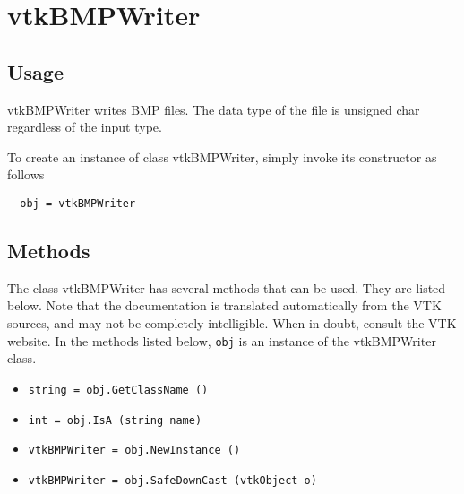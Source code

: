 \section{vtkBMPWriter}

\subsection{Usage}

 vtkBMPWriter writes BMP files. The data type
 of the file is unsigned char regardless of the input type.

To create an instance of class vtkBMPWriter, simply
invoke its constructor as follows
\begin{verbatim}
  obj = vtkBMPWriter
\end{verbatim}
\subsection{Methods}

The class vtkBMPWriter has several methods that can be used.
  They are listed below.
Note that the documentation is translated automatically from the VTK sources,
and may not be completely intelligible.  When in doubt, consult the VTK website.
In the methods listed below, \verb|obj| is an instance of the vtkBMPWriter class.
\begin{itemize}
\item  \verb|string = obj.GetClassName ()|

\item  \verb|int = obj.IsA (string name)|

\item  \verb|vtkBMPWriter = obj.NewInstance ()|

\item  \verb|vtkBMPWriter = obj.SafeDownCast (vtkObject o)|

\end{itemize}
